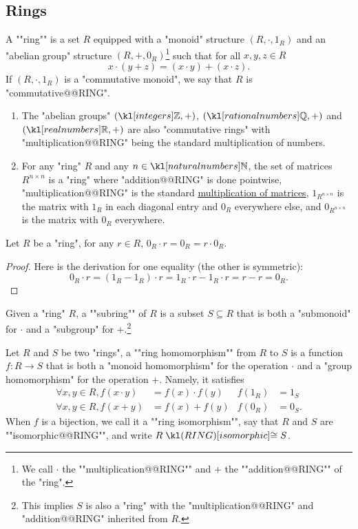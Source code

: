\documentclass[main.tex]{subfiles}
\begin{document}
\subsection{Rings}
\begin{defn}[Ring]
	\AP A ""ring"" is a set $R$ equipped with a "monoid" structure $(R,\cdot,1_R)$ and an "abelian group" structure $(R,+,0_R)$\footnote{\AP We call $\cdot$ the ""multiplication@@RING"" and $+$ the ""addition@@RING"" of the "ring".} such that for all $x,y,z \in R$
	\[x\cdot(y+z) = (x\cdot y)+(x\cdot z).\]
	If $(R,\cdot,1_R)$ is a "commutative monoid", we say that $R$ is "commutative@@RING".
\end{defn}
\begin{exmps}
	\begin{enumerate}
		\item The "abelian groups" $(\Z, +)$, $(\Q,+)$ and $(\R,+)$ are also "commutative rings" with "multiplication@@RING" being the standard multiplication of numbers.
		\item For any "ring" $R$ and any $n \in \N$, the set of matrices $R^{n\times n}$ is a "ring" where "addition@@RING" is done pointwise, "multiplication@@RING" is the standard \href{https://en.wikipedia.org/wiki/Matrix_multiplication}{multiplication of matrices}, $1_{R^{n\times n}}$ is the matrix with $1_R$ in each diagonal entry and $0_R$ everywhere else, and $0_{R^{n\times n}}$ is the matrix with $0_R$ everywhere.
	\end{enumerate} %
\end{exmps}
\begin{prop}
	Let $R$ be a "ring", for any $r \in R$, $0_R \cdot r = 0_R = r \cdot 0_R$.
\end{prop}
\begin{proof}
	Here is the derivation for one equality (the other is symmetric):
	\[0_R \cdot r = (1_R - 1_R) \cdot r = 1_R\cdot r - 1_R \cdot r = r-r = 0_R.\]
\end{proof}
\begin{defn}[Subring]
	\AP Given a "ring" $R$, a ""subring"" of $R$ is a subset $S\subseteq R$ that is both a "submonoid" for $\cdot$ and a "subgroup" for $+$.\footnote{This implies $S$ is also a "ring" with the "multiplication@@RING" and "addition@@RING" inherited from $R$.}
\end{defn}
\begin{defn}[Homomorphism]
	\AP Let $R$ and $S$ be two "rings", a ""ring homomorphism"" from $R$ to $S$ is a function $f: R \rightarrow S$ that is both a "monoid homomorphism" for the operation $\cdot$ and a "group homomorphism" for the operation $+$. Namely, it satisfies
	\begin{align*}
		\forall x,y \in R, f(x\cdot y) &= f(x)\cdot f(y) &f(1_R) &= 1_S\\
		\forall x,y\in R, f(x+y) &= f(x) + f(y) &f(0_R) &= 0_S.
	\end{align*}
	\AP When $f$ is a bijection, we call it a ""ring isomorphism"", say that $R$ and $S$ are ""isomorphic@@RING"", and write $R \isoRING S$.
\end{defn}
\end{document}
